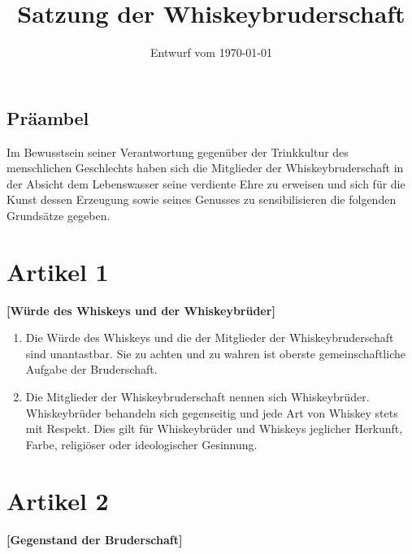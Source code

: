 \documentclass[a4paper,12pt]{article}
\title{Satzung der Whiskeybruderschaft}
\date{Entwurf vom \today}
\begin{document}
\maketitle

\clearpage

\begin{center}
\section*{Präambel}
Im Bewusstsein seiner Verantwortung gegenüber der Trinkkultur des menschlichen Geschlechts haben
sich die Mitglieder der Whiskeybruderschaft in der Absicht dem Lebenswasser seine verdiente Ehre zu
erweisen und sich für die Kunst dessen Erzeugung sowie seines Genusses zu sensibilisieren die
folgenden Grundsätze gegeben.
\end{center}

\clearpage



\section*{Artikel 1}
\textbf{[Würde des Whiskeys und der Whiskeybrüder]}

\begin{enumerate}

\item Die Würde des Whiskeys und die der Mitglieder der Whiskeybruderschaft sind unantastbar. Sie zu
  achten und zu wahren ist oberste gemeinschaftliche Aufgabe der Bruderschaft.

\item Die Mitglieder der Whiskeybruderschaft nennen sich Whiskeybrüder. Whiskeybrüder behandeln sich
  gegenseitig und jede Art von Whiskey stets mit Respekt. Dies gilt für Whiskeybrüder und Whiskeys
  jeglicher Herkunft, Farbe, religiöser oder ideologischer Gesinnung.

\end{enumerate}



\section*{Artikel 2}
\textbf{[Gegenstand der Bruderschaft]}
\end{document}
